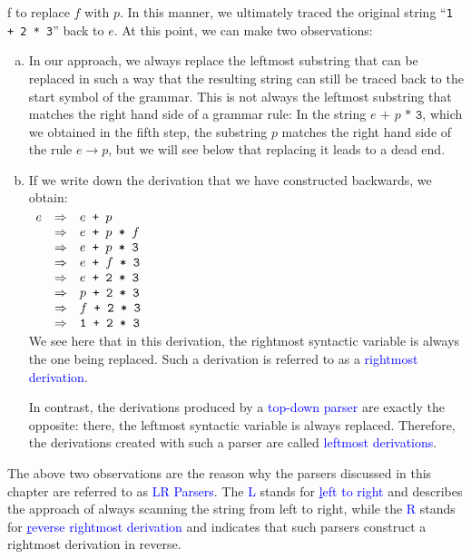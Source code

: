 \rightarrow f\) to replace \(f\) with \(p\). In this manner, we ultimately traced the original string
``\texttt{1 + 2 * 3}'' back to \(e\). At this point, we can make two observations: 
\begin{enumerate}[(a)]
\item In our approach, we always replace the leftmost substring that can be replaced in such a way that the
      resulting string can still be traced back to the start symbol of the grammar.  This is not always the
      leftmost substring that matches the right hand side of a grammar rule:  In the string
      \(e \texttt{ + } p \texttt{ * 3}\), which we obtained in the fifth step, the substring \(p\) matches the
      right hand side of the rule \(e \rightarrow p\), but we will see below that replacing it leads to a dead end.
\item If we write down the derivation that we have constructed backwards, we obtain:
\\[0.2cm]
\hspace*{1.3cm}
$
\begin{array}[t]{lcl}
e  & \Rightarrow & e \texttt{ + } p \\
   & \Rightarrow & e \texttt{ + } p \texttt{ * } f \\
   & \Rightarrow & e \texttt{ + } p \texttt{ * 3} \\
   & \Rightarrow & e \texttt{ + } f \texttt{ * 3} \\
   & \Rightarrow & e \texttt{ + 2 * 3} \\
   & \Rightarrow & p \texttt{ + 2 * 3} \\
   & \Rightarrow & f \texttt{ + 2 * 3} \\
   & \Rightarrow & \texttt{1 + 2 * 3}
\end{array}
$
   \\[0.2cm]
   We see here that in this derivation, the rightmost syntactic variable is always the one being replaced. Such
   a derivation is referred to as a \textcolor{blue}{rightmost derivation}. 

   In contrast, the derivations produced by a \textcolor{blue}{top-down parser} are exactly the opposite:
   there, the leftmost syntactic variable is always replaced. Therefore, the derivations created with such a
   parser are called \textcolor{blue}{leftmost derivations}. 
\end{enumerate}
The above two observations are the reason why the parsers discussed in this chapter are referred to as
\textcolor{blue}{LR Parsers}. The \textcolor{blue}{L} stands for \textcolor{blue}{\underline{l}eft to right}
and describes the approach of always scanning the string from left to right, while the \textcolor{blue}{R}
stands for \textcolor{blue}{\underline{r}everse rightmost derivation} and indicates that such parsers construct
a rightmost derivation in reverse. 
\vspace*{0.2cm}

